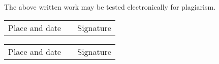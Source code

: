 \vspace{0.5cm}

The above written work may be tested electronically for plagiarism.

\vspace{2.5cm}

\begin{tabular}{ p{5cm} p{1cm} p{5cm} }
  \cline{1-1} \cline{3-3}
  Place and date & & Signature \\
\end{tabular}

\vspace{2.5cm}

\begin{tabular}{ p{5cm} p{1cm} p{5cm} }
  \cline{1-1} \cline{3-3}
  Place and date & & Signature \\
\end{tabular}


